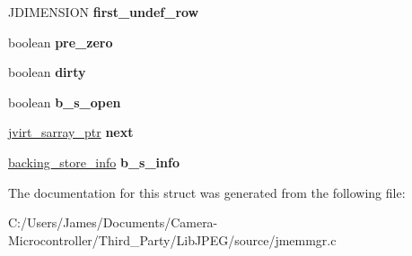 \begin{DoxyCompactItemize}
J\+D\+I\+M\+E\+N\+S\+I\+ON {\bfseries first\+\_\+undef\+\_\+row}
\item 
\mbox{\label{structjvirt__sarray__control_a385a56e2499279ae94ba3b818c6795f9}} 
boolean {\bfseries pre\+\_\+zero}
\item 
\mbox{\label{structjvirt__sarray__control_aa544a71dce60a3eefcfcf189170eca92}} 
boolean {\bfseries dirty}
\item 
\mbox{\label{structjvirt__sarray__control_a03c4b5b5d8c5855cc6878a9728d7f685}} 
boolean {\bfseries b\+\_\+s\+\_\+open}
\item 
\mbox{\label{structjvirt__sarray__control_acfc83c86716393cce99f1ab025c06e18}} 
\hyperlink{structjvirt__sarray__control}{jvirt\+\_\+sarray\+\_\+ptr} {\bfseries next}
\item 
\mbox{\label{structjvirt__sarray__control_ace5a2d0508aee931405de00db46a728a}} 
\hyperlink{structbacking__store__struct}{backing\+\_\+store\+\_\+info} {\bfseries b\+\_\+s\+\_\+info}
\end{DoxyCompactItemize}


The documentation for this struct was generated from the following file\+:\begin{DoxyCompactItemize}
\item 
C\+:/\+Users/\+James/\+Documents/\+Camera-\/\+Microcontroller/\+Third\+\_\+\+Party/\+Lib\+J\+P\+E\+G/source/jmemmgr.\+c\end{DoxyCompactItemize}
